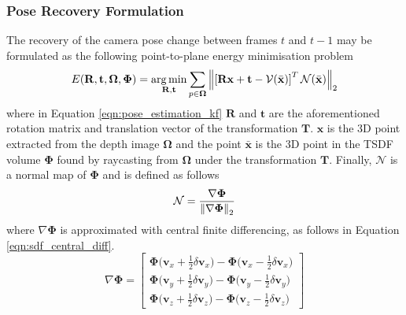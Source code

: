 \subsubsection{Pose Recovery Formulation}
\label{subsub:moseg_static_camera_poserec}
The recovery of the camera pose change between frames $t$ and $t-1$ may be
formulated as the following point-to-plane energy minimisation problem
\begin{equation}
  \label{eqn:pose_estimation_kf}
  E(\mathbf{R}, \mathbf{t}, \mathbf{\Omega}, \mathbf{\Phi}) =
  \operatorname*{arg\,min}_{\mathbf{R}, \mathbf{t}} \sum_{p \in \mathbf{\Omega}}
  \left\lVert\left[
    \mathbf{Rx} + \mathbf{t} - \mathcal{V}(\bar{\mathbf{x}})
  \right]^{T}
  \mathcal{N}(\bar{\mathbf{x}})\right\rVert_{2}
\end{equation}
where in Equation \ref{eqn:pose_estimation_kf} $\mathbf{R}$ and $\mathbf{t}$ are 
the aforementioned rotation matrix and translation vector of the transformation 
$\mathbf{T}$. $\mathbf{x}$ is the 3D point extracted from the depth image 
$\mathbf{\Omega}$ and the point $\bar{\mathbf{x}}$ is the 3D point in the TSDF 
volume $\mathbf{\Phi}$ found by raycasting from $\mathbf{\Omega}$ under the 
transformation $\mathbf{T}$. Finally, $\mathcal{N}$ is a normal map of 
$\mathbf{\Phi}$ and is defined as follows
\begin{equation}
  \label{eqn:normal_map_definition}
  \mathcal{N} = \frac{\nabla \mathbf{\Phi}}{\left\lVert\nabla \mathbf{\Phi}\right\rVert_{2}}
\end{equation}
where $\nabla \mathbf{\Phi}$ is approximated with central finite differencing, 
as follows in Equation \ref{eqn:sdf_central_diff}.
\begin{equation}
  \label{eqn:sdf_central_diff}
  \nabla \mathbf{\Phi} = 
    \begin{bmatrix}
      \mathbf{\Phi} \big(\mathbf{v}_{x} + \frac{1}{2}\delta \mathbf{v}_{x}\big) -
      \mathbf{\Phi} \big(\mathbf{v}_{x} - \frac{1}{2}\delta \mathbf{v}_{x}\big)\\
      \mathbf{\Phi} \big(\mathbf{v}_{y} + \frac{1}{2}\delta \mathbf{v}_{y}\big) -
      \mathbf{\Phi} \big(\mathbf{v}_{y} - \frac{1}{2}\delta \mathbf{v}_{y}\big)\\
      \mathbf{\Phi} \big(\mathbf{v}_{z} + \frac{1}{2}\delta \mathbf{v}_{z}\big) -
      \mathbf{\Phi} \big(\mathbf{v}_{z} - \frac{1}{2}\delta \mathbf{v}_{z}\big)
    \end{bmatrix}
\end{equation}

